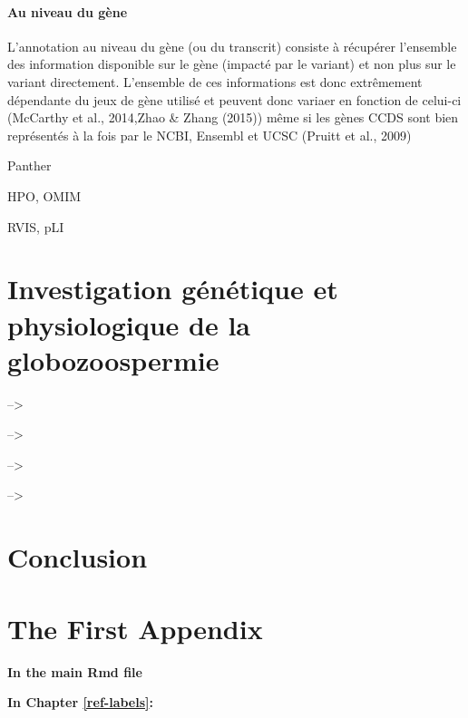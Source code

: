 \documentclass[12pt,twoside]{reedthesis}
\theoremstyle{definition}
\theoremstyle{definition}
\theoremstyle{remark}
\begin{document}
  \subsubsection{Au niveau du gène}\label{au-niveau-du-gene}
  
  L'annotation au niveau du gène (ou du transcrit) consiste à récupérer
  l'ensemble des information disponible sur le gène (impacté par le
  variant) et non plus sur le variant directement. L'ensemble de ces
  informations est donc extrêmement dépendante du jeux de gène utilisé et
  peuvent donc variaer en fonction de celui-ci (McCarthy et al., 2014,Zhao
  \& Zhang (2015)) même si les gènes CCDS sont bien représentés à la fois
  par le NCBI, Ensembl et UCSC (Pruitt et al., 2009)
  
  Panther
  
  HPO, OMIM
  
  RVIS, pLI
  
  \chapter{Investigation génétique et physiologique de la
  globozoospermie}\label{globo}
  
  --\textgreater{}
  
  --\textgreater{}
  
  --\textgreater{}
  
  --\textgreater{}
  
  \chapter*{Conclusion}\label{conclusion}
  
  \appendix
  
  \chapter{The First Appendix}\label{the-first-appendix}
  
  \textbf{In the main Rmd file}
  
  \textbf{In Chapter \ref{ref-labels}:}
  
\end{document}
